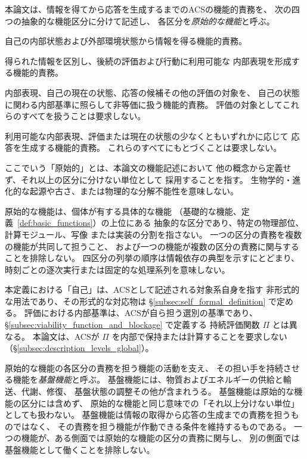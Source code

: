 \begin{definition}
\label{def:primitive_functions}
本論文は、情報を得てから応答を生成するまでのACSの機能的責務を、
次の四つの抽象的な機能区分に分けて記述し、
各区分を\emph{原始的な機能}と呼ぶ。
\begin{description}[style=nextline]
  \item[感知]
  自己の内部状態および外部環境状態から情報を得る機能的責務。
  \item[識別]
  得られた情報を区別し、後続の評価および行動に利用可能な
  内部表現を形成する機能的責務。
  \item[評価]
  内部表現、自己の現在の状態、応答の候補その他の評価の対象を、
  自己の状態に関わる内部基準に照らして非等価に扱う機能的責務。
  評価の対象としてこれらのすべてを扱うことは要求しない。
  \item[行動]
  利用可能な内部表現、評価または現在の状態の少なくともいずれかに応じて
  応答を生成する機能的責務。
  これらのすべてにもとづくことは要求しない。
\end{description}

ここでいう「原始的」とは、本論文の機能記述において
他の概念から定義せず、それ以上の区分に分けない単位として
採用することを指す。
生物学的・進化的な起源や古さ、または物理的な分解不能性を意味しない。

原始的な機能は、個体が有する具体的な機能
（基礎的な機能、定義~\ref{def:basic_functions}）の上位にある
抽象的な区分であり、特定の物理部位、計算モジュール、写像
または実装の分割を指さない。
一つの区分の責務を複数の機能が共同して担うこと、
および一つの機能が複数の区分の責務に関与することを排除しない。
四区分の列挙の順序は情報依存の典型を示すにとどまり、
時刻ごとの逐次実行または固定的な処理系列を意味しない。

本定義における「自己」は、ACSとして記述される対象系自身を指す
非形式的な用法であり、その形式的な対応物は
\S\ref{subsec:self_formal_definition} で定める。
評価における内部基準は、ACSが自ら担う選別の基準であり、
\S\ref{subsec:viability_function_and_blockage} で定義する
持続評価関数 $\Pi$ とは異なる。
本論文は、ACSが $\Pi$ を内部で保持または計算することを要求しない
（\S\ref{subsec:description_levels_global}）。
\end{definition}

\begin{definition}
\label{def:base_functions}
原始的な機能の各区分の責務を担う機能の活動を支え、
その担い手を持続させる機能を\emph{基盤機能}と呼ぶ。
基盤機能には、物質およびエネルギーの供給と輸送、代謝、修復、
基盤状態の調整その他が含まれうる。
基盤機能は原始的な機能の区分には含めず、
原始的な機能と同じ意味での「それ以上分けない単位」としても扱わない。
基盤機能は情報の取得から応答の生成までの責務を担うものではなく、
その責務を担う機能が作動できる条件を維持するものである。
一つの機能が、ある側面では原始的な機能の区分の責務に関与し、
別の側面では基盤機能として働くことを排除しない。
\end{definition}

